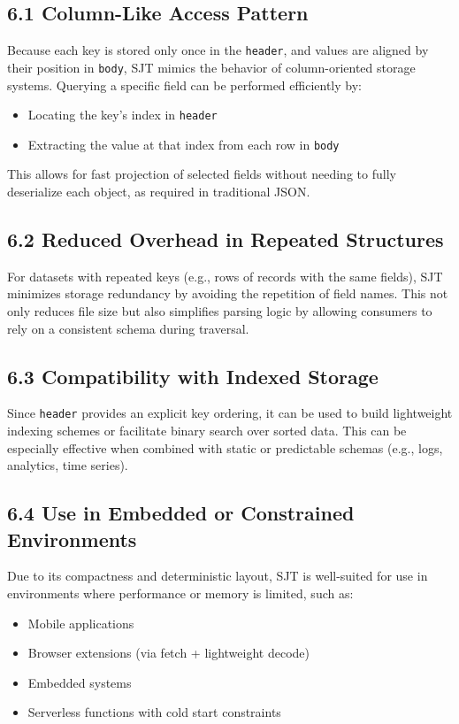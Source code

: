 \documentclass[12pt]{article}
\begin{document}
\subsection*{6.1 Column-Like Access Pattern}
Because each key is stored only once in the \texttt{header}, and values are aligned by their position in \texttt{body}, SJT mimics the behavior of column-oriented storage systems. Querying a specific field can be performed efficiently by:

\begin{itemize}
  \item Locating the key's index in \texttt{header}
  \item Extracting the value at that index from each row in \texttt{body}
\end{itemize}

This allows for fast projection of selected fields without needing to fully deserialize each object, as required in traditional JSON.

\subsection*{6.2 Reduced Overhead in Repeated Structures}
For datasets with repeated keys (e.g., rows of records with the same fields), SJT minimizes storage redundancy by avoiding the repetition of field names. This not only reduces file size but also simplifies parsing logic by allowing consumers to rely on a consistent schema during traversal.

\subsection*{6.3 Compatibility with Indexed Storage}
Since \texttt{header} provides an explicit key ordering, it can be used to build lightweight indexing schemes or facilitate binary search over sorted data. This can be especially effective when combined with static or predictable schemas (e.g., logs, analytics, time series).

\subsection*{6.4 Use in Embedded or Constrained Environments}
Due to its compactness and deterministic layout, SJT is well-suited for use in environments where performance or memory is limited, such as:

\begin{itemize}
  \item Mobile applications
  \item Browser extensions (via fetch + lightweight decode)
  \item Embedded systems
  \item Serverless functions with cold start constraints
\end{itemize}
\end{document}
